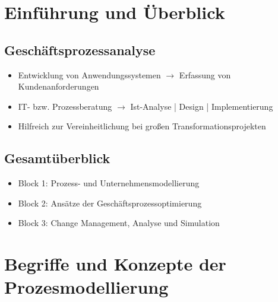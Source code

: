 \section{Einführung und Überblick} %
\subsection{Geschäftsprozessanalyse}

\begin{itemize}
\item Entwicklung von Anwendungssystemen $\rightarrow$ Erfassung von Kundenanforderungen
\item IT- bzw. Prozessberatung $\rightarrow$ Ist-Analyse | Design | Implementierung 
\item Hilfreich zur Vereinheitlichung bei großen Transformationsprojekten
\end{itemize}

\subsection{Gesamtüberblick}

\begin{itemize}
\item Block 1: Prozess- und Unternehmensmodellierung
\item Block 2: Ansätze der Geschäftsprozessoptimierung
\item Block 3: Change Management, Analyse und Simulation
\end{itemize}

\section{Begriffe und Konzepte der Prozesmodellierung} %
